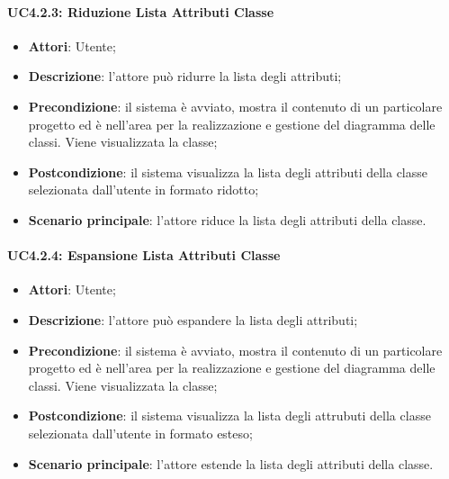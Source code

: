 \begin{itemize}
\begin{itemize}
\paragraph{UC4.2.3: Riduzione Lista Attributi Classe}
\label{UC4.2.3}
\begin{itemize}
	\item \textbf{Attori}: Utente;
	\item \textbf{Descrizione}: l'attore può ridurre la lista degli attributi;
	\item \textbf{Precondizione}: il sistema è avviato, mostra il contenuto di un particolare progetto ed è nell'area per la realizzazione e gestione del diagramma delle classi. Viene visualizzata la classe;
	\item \textbf{Postcondizione}: il sistema visualizza la lista degli attributi della classe selezionata dall'utente in formato ridotto;
	\item \textbf{Scenario principale}: l'attore riduce la lista degli attributi della classe.
\end{itemize}

\paragraph{UC4.2.4: Espansione Lista Attributi Classe}
\label{UC4.2.4}
\begin{itemize}
	\item \textbf{Attori}: Utente;
	\item \textbf{Descrizione}: l'attore può espandere la lista degli attributi;
	\item \textbf{Precondizione}: il sistema è avviato, mostra il contenuto di un particolare progetto ed è nell'area per la realizzazione e gestione del diagramma delle classi. Viene visualizzata la classe;
	\item \textbf{Postcondizione}: il sistema visualizza la lista degli attrubuti della classe selezionata dall'utente in formato esteso;
	\item \textbf{Scenario principale}: l'attore estende la lista degli attributi della classe.
\end{itemize}


\end{itemize}
\end{itemize}
